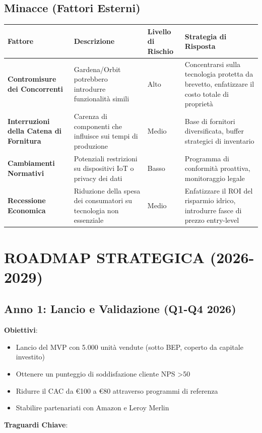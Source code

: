 \documentclass[11pt,a4paper]{report}
\begin{document}
\section{Minacce (Fattori Esterni)}

\begin{longtable}{|p{3cm}|p{3.5cm}|p{2cm}|p{3.5cm}|}
\hline
\textbf{Fattore} & \textbf{Descrizione} & \textbf{Livello di Rischio} & \textbf{Strategia di Risposta} \\ \hline
\textbf{Contromisure dei Concorrenti} & Gardena/Orbit potrebbero introdurre funzionalità simili & Alto & Concentrarsi sulla tecnologia protetta da brevetto, enfatizzare il costo totale di proprietà \\ \hline
\textbf{Interruzioni della Catena di Fornitura} & Carenza di componenti che influisce sui tempi di produzione & Medio & Base di fornitori diversificata, buffer strategici di inventario \\ \hline
\textbf{Cambiamenti Normativi} & Potenziali restrizioni su dispositivi IoT o privacy dei dati & Basso & Programma di conformità proattiva, monitoraggio legale \\ \hline
\textbf{Recessione Economica} & Riduzione della spesa dei consumatori su tecnologia non essenziale & Medio & Enfatizzare il ROI del risparmio idrico, introdurre fasce di prezzo entry-level \\ \hline
\end{longtable}

\chapter{ROADMAP STRATEGICA (2026-2029)}

\section{Anno 1: Lancio e Validazione (Q1-Q4 2026)}
\textbf{Obiettivi}:
\begin{itemize}
    \item Lancio del MVP con 5.000 unità vendute (sotto BEP, coperto da capitale investito)
    \item Ottenere un punteggio di soddisfazione cliente NPS >50
    \item Ridurre il CAC da €100 a €80 attraverso programmi di referenza
    \item Stabilire partenariati con Amazon e Leroy Merlin
\end{itemize}

\textbf{Traguardi Chiave}:
\end{document}

